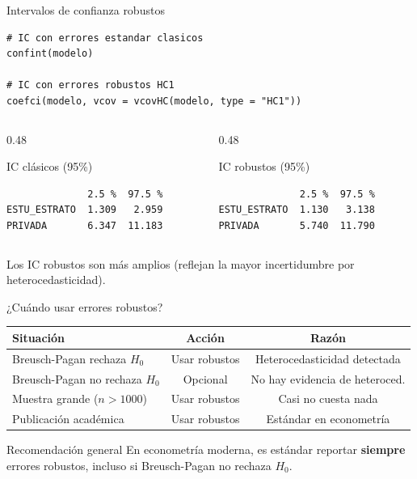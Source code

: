 \documentclass[aspectratio=169, 11pt]{beamer}
\begin{document}
\begin{frame}[fragile]{Intervalos de confianza robustos}
\begin{lstlisting}
# IC con errores estandar clasicos
confint(modelo)

# IC con errores robustos HC1
coefci(modelo, vcov = vcovHC(modelo, type = "HC1"))
\end{lstlisting}

\vspace{0.15cm}
\begin{columns}
\begin{column}{0.48\textwidth}
\begin{exampleblock}{IC clásicos (95\%)}
\small
\begin{verbatim}
              2.5 %  97.5 %
ESTU_ESTRATO  1.309   2.959
PRIVADA       6.347  11.183
\end{verbatim}
\end{exampleblock}
\end{column}

\begin{column}{0.48\textwidth}
\begin{exampleblock}{IC robustos (95\%)}
\small
\begin{verbatim}
              2.5 %  97.5 %
ESTU_ESTRATO  1.130   3.138
PRIVADA       5.740  11.790
\end{verbatim}
\end{exampleblock}
\end{column}
\end{columns}

\vspace{0.1cm}
\small
Los IC robustos son más amplios (reflejan la mayor incertidumbre por heterocedasticidad).
\end{frame}

\begin{frame}{¿Cuándo usar errores robustos?}
\begin{center}
\renewcommand{\arraystretch}{1.4}
\begin{tabular}{lcc}
\toprule
\textbf{Situación} & \textbf{Acción} & \textbf{Razón} \\
\midrule
Breusch-Pagan rechaza $H_0$ & Usar robustos & Heterocedasticidad detectada \\
Breusch-Pagan no rechaza $H_0$ & Opcional & No hay evidencia de heteroced. \\
Muestra grande ($n > 1000$) & Usar robustos & Casi no cuesta nada \\
Publicación académica & Usar robustos & Estándar en econometría \\
\bottomrule
\end{tabular}
\end{center}

\vspace{0.15cm}
\begin{block}{Recomendación general}
En econometría moderna, es estándar reportar \textbf{siempre} errores robustos, incluso si Breusch-Pagan no rechaza $H_0$.
\end{block}
\end{frame}
\end{document}
